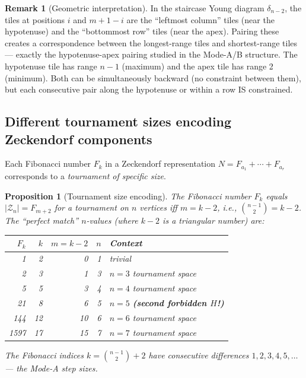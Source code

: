 \documentclass[12pt,reqno]{amsart}
\newtheorem{proposition}[theorem]{Proposition}
\theoremstyle{definition}
\newtheorem{remark}[theorem]{Remark}
\theoremstyle{plain}
\begin{document}
\begin{remark}[Geometric interpretation]
In the staircase Young diagram $\delta_{n-2}$, the tiles at positions $i$
and $m+1-i$ are the ``leftmost column'' tiles (near the hypotenuse) and
the ``bottommost row'' tiles (near the apex).  Pairing these creates a
correspondence between the longest-range tiles and shortest-range tiles
— exactly the hypotenuse-apex pairing studied in the Mode-A/B structure.
The hypotenuse tile has range $n-1$ (maximum) and the apex tile has range 2
(minimum).  Both can be simultaneously backward (no constraint between them),
but each consecutive pair along the hypotenuse or within a row IS constrained.
\end{remark}

\subsection{Different tournament sizes encoding Zeckendorf components}
\label{ssec:tournament-sizes}

Each Fibonacci number $F_k$ in a Zeckendorf representation
$N=F_{a_1}+\cdots+F_{a_r}$ corresponds to a \emph{tournament of specific size}.

\begin{proposition}[Tournament size encoding]\label{prop:tournament-size}
The Fibonacci number $F_k$ equals $|\mathcal{Z}_n|=F_{m+2}$ for a tournament
on $n$ vertices iff $m=k-2$, i.e., $\binom{n-1}{2}=k-2$.  The ``perfect match''
$n$-values (where $k-2$ is a triangular number) are:
\begin{center}
\begin{tabular}{rrrrl}
\toprule
$F_k$ & $k$ & $m=k-2$ & $n$ & Context\\
\midrule
1  & 2 & 0 & 1 & trivial\\
2  & 3 & 1 & 3 & $n=3$ tournament space\\
5  & 5 & 3 & 4 & $n=4$ tournament space\\
21 & 8 & 6 & 5 & $n=5$ \textbf{(second forbidden $H$!)}\\
144& 12& 10& 6 & $n=6$ tournament space\\
1597&17 & 15& 7 & $n=7$ tournament space\\
\bottomrule
\end{tabular}
\end{center}
The Fibonacci indices $k=\binom{n-1}{2}+2$ have consecutive differences
$1,2,3,4,5,\ldots$ — the Mode-A step sizes.
\end{proposition}
\end{document}
